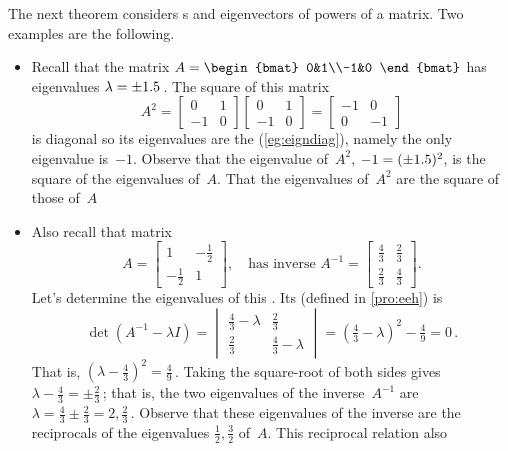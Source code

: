 \begin{example} \label{eg:2x2powmat}
The next theorem considers s and eigenvectors of powers of a matrix.  
Two examples are the following.
\begin{itemize}
\item Recall that the matrix \(A=\begin{bmat} 0&1\\-1&0 \end{bmat}\) has eigenvalues \(\lambda=\pm 1.5\)\,.  The square of this matrix
\begin{equation*}
A^2=\begin{bmatrix} 0&1\\-1&0 \end{bmatrix}\begin{bmatrix} 0&1\\-1&0 \end{bmatrix}
=\begin{bmatrix} -1&0\\0&-1 \end{bmatrix}
\end{equation*}
is diagonal so its eigenvalues are the  (\cref{eg:eigndiag}), namely the only eigenvalue is~\(-1\).
Observe that the eigenvalue of~\(A^2\), \(-1=(\pm 1.5)^2\), is the square of the eigenvalues of~\(A\).
That the eigenvalues of~\(A^2\) are the square of those of~\(A\) 

\item Also recall that matrix 
\begin{equation*}
A=\begin{bmatrix} 1&-\frac12\\-\frac12&1 \end{bmatrix},
\quad\text{has inverse }A^{-1}=\begin{bmatrix} \frac43&\frac23\\\frac23&\frac43 \end{bmatrix}.
\end{equation*}
Let's determine the eigenvalues of this .
Its  (defined in \cref{pro:eeh}) is
\begin{equation*}
\det(A^{-1}-\lambda I)
=\begin{vmatrix} \frac43-\lambda&\frac23\\\frac23&\frac43-\lambda \end{vmatrix}
=(\tfrac43-\lambda)^2-\tfrac49=0\,.
\end{equation*}
That is, \((\lambda-\tfrac43)^2=\tfrac49\)\,.
Taking the square-root of both sides gives \(\lambda-\tfrac43=\pm\tfrac23\)\,; that is, the two eigenvalues of the inverse~\(A^{-1}\) are \(\lambda=\tfrac43\pm\tfrac23=2,\tfrac23\)\,.
Observe that these eigenvalues of the inverse are the reciprocals of the eigenvalues \(\frac12,\frac32\) of~\(A\).
This reciprocal relation also 


\end{itemize}
\end{example}
